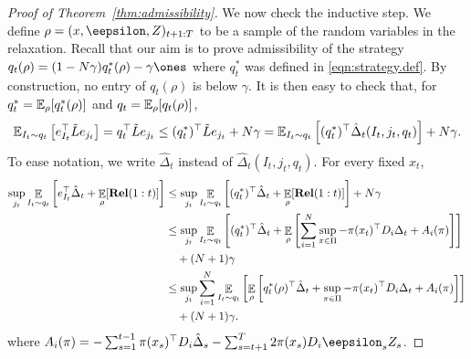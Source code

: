\documentclass[11pt]{article}
\newcommand{\rel}{\mathbf{Rel}}
\begin{document}
\begin{proof}[Proof of Theorem~\ref{thm:admissibility}]
  We now check the inductive step. We define $\rho = (x,\eepsilon,Z)_{t+1:T}$ to be a sample of the random variables in the relaxation. Recall that our aim is to prove admissibility of the strategy $q_t(\rho) = (1-N\gamma)q_t^*(\rho)- \gamma \ones$ where $q_t^*$ was defined in \eqref{eqn:strategy.def}.  By construction, no entry of $q_t(\rho)$ is below $\gamma$. It is then easy to check that, for $q_t^* = \mathbb E_{\rho}[q_t^*(\rho)]$ and $q_t = \mathbb E_{\rho}[q_t(\rho)]$,
\[
  \mathbb E_{I_t \sim q_t}\left[ e_{I_t}^\top \tilde L e_{j_t} \right] = q_t^\top \tilde L e_{j_t} \leq (q_t^*)^\top\tilde L e_{j_t} + N\gamma
  =
  \mathbb E_{I_t\sim q_t} \left[ (q_t^*)^\top\hat \Delta_t(I_t,j_t,q_t) \right] + N\gamma.
\]
To ease notation, we write $\hat\Delta_t$ instead of $\hat \Delta_t(I_t,j_t,q_t)$. For every fixed $x_t$,
\begin{align*}
  \sup_{j_t} \mathop{\ex}_{I_t\sim q_t}\left[ e_{I_t}^\top \hat \Delta_t
  + \mathop{\ex}_{\rho}[\rel(1:t)]\right]
  &\leq
    \sup_{j_t } \mathop{\ex}_{I_t\sim q_t}\left[ (q_t^*)^\top \hat \Delta_t
    + \mathop{\ex}_{\rho}[\rel(1:t)]\right] + N\gamma\\
  &\leq
    \sup_{j_t } \mathop{\ex}_{I_t\sim q_t}\left[ (q_t^*)^\top \hat \Delta_t
    +
    \mathop{\ex}_{\rho}\left[\sum_{i=1}^N\sup_{\pi\in\Pi} - \pi(x_t)^\top D_i\Delta_t
    + A_i(\pi)\right]\right]\\
  &\quad+(N+1)\gamma\\
  &\leq
    \sup_{j_t } \sum_{i=1}^N\mathop{\ex}_{I_t\sim q_t}\left[\mathop{\ex}_{\rho}\left[ q_t^*(\rho)^\top \hat \Delta_t
    +
    \sup_{\pi\in\Pi} -\pi(x_t)^\top D_i\Delta_t + A_i(\pi)\right]\right]\\
  &\quad+(N+1)\gamma.
\end{align*}
where $A_i(\pi) = -\sum_{s=1}^{t-1} \pi(x_s)^\top D_i \hat \Delta_s - \sum_{s=t+1}^T 2\pi(x_s) D_i \eepsilon_{s} Z_{s}$.



\end{proof}
\end{document}
